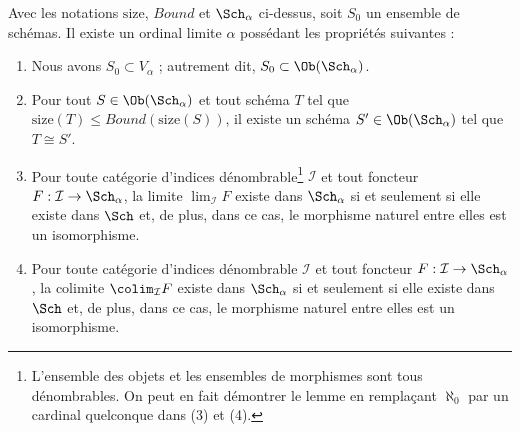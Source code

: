 \begin{lemma}
\label{lemma-construct-category}
Avec les notations $\text{size}$, $Bound$ et $\Sch_\alpha$ ci-dessus, soit
$S_0$ un ensemble de schémas. Il existe un ordinal limite $\alpha$ possédant
les propriétés suivantes :
\begin{enumerate}
\item
\label{item-inclusion}
Nous avons $S_0 \subset V_\alpha$ ; autrement dit,
$S_0 \subset \Ob(\Sch_\alpha)$.
\item
\label{item-bounded}
Pour tout $S \in \Ob(\Sch_\alpha)$ et tout schéma $T$ tel que
$\text{size}(T) \leq Bound(\text{size}(S))$, il existe un schéma
$S' \in \Ob(\Sch_\alpha)$ tel que $T \cong S'$.
\item
\label{item-limit}
Pour toute catégorie d'indices dénombrable\footnote{L'ensemble des objets
et les ensembles de morphismes sont tous dénombrables. On peut en fait
démontrer le lemme en remplaçant $\aleph_0$ par un cardinal quelconque dans
(3) et (4).} $\mathcal{I}$ et tout foncteur
$F : \mathcal{I} \to \Sch_\alpha$, la limite $\lim_\mathcal{I} F$ existe dans
$\Sch_\alpha$ si et seulement si elle existe dans $\Sch$ et, de plus, dans ce
cas, le morphisme naturel entre elles est un isomorphisme.
\item
\label{item-colimit}
Pour toute catégorie d'indices dénombrable $\mathcal{I}$ et tout foncteur
$F : \mathcal{I} \to \Sch_\alpha$, la colimite $\colim_\mathcal{I} F$ existe
dans $\Sch_\alpha$ si et seulement si elle existe dans $\Sch$ et, de plus,
dans ce cas, le morphisme naturel entre elles est un isomorphisme.
\end{enumerate}
\end{lemma}

